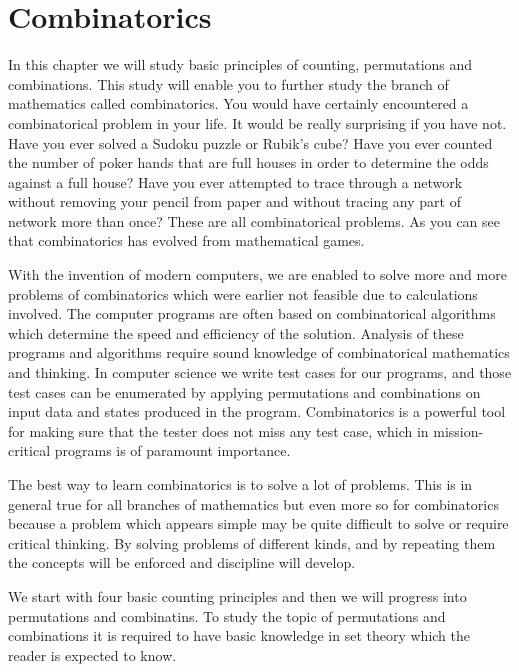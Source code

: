 \chapter{Combinatorics}
In this chapter we will study basic principles of counting, permutations and combinations. This study will enable you to further
study the branch of mathematics called combinatorics. You would have certainly encountered a combinatorical problem in your
life. It would be really surprising if you have not. Have you ever solved a Sudoku puzzle or Rubik's cube? Have you ever counted
the number of poker hands that are full houses in order to determine the odds against a full house? Have you ever attempted to
trace through a network without removing your pencil from paper and without tracing any part of network more than once? These are
all combinatorical problems. As you can see that combinatorics has evolved from mathematical games.

With the invention of modern computers, we are enabled to solve more and more problems of combinatorics which were earlier not
feasible due to calculations involved. The computer programs are often based on combinatorical algorithms which determine the speed
and efficiency of the solution. Analysis of these programs and algorithms require sound knowledge of combinatorical mathematics and
thinking. In computer science we write test cases for our programs, and those test cases can be enumerated by applying permutations
and combinations on input data and states produced in the program. Combinatorics is a powerful tool for making sure that the tester
does not miss any test case, which in mission-critical programs is of paramount importance.

The best way to learn combinatorics is to solve a lot of problems. This is in general true for all branches of mathematics but even
more so for combinatorics because a problem which appears simple may be quite difficult to solve or require critical thinking. By
solving problems of different kinds, and by repeating them the concepts will be enforced and discipline will develop.

We start with four basic counting principles and then we will progress into permutations and combinatins. To study the topic of
permutations and combinations it is required to have basic knowledge in set theory which the reader is expected to know.

